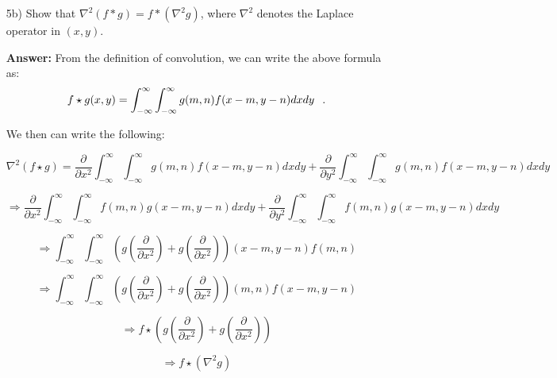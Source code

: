 \documentclass{article}
\begin{document}
\begin{enumerate}
\newpage
\item[5b)] Show that $\nabla ^2(f*g)=f*(\nabla ^2g)$, where $\nabla ^2$ denotes the Laplace operator in $(x,y)$. 

\textbf{Answer: }From the definition of convolution, we can write the above formula as:
$$f \star g(x,y) = \int_{-\infty}^{\infty} \int_{-\infty}^{\infty} g(m,n) f(x - m, y - n) dxdy\hspace{0.1in} .$$

We then can write the following:

\small
\begin{equation}
\nabla ^2 (f \star g) = \frac{\partial}{\partial x^2} \int_{-\infty}^{\infty} \int_{-\infty}^{\infty} g(m,n) f(x - m, y - n) dxdy + \frac{\partial}{\partial y^2} \int_{-\infty}^{\infty} \int_{-\infty}^{\infty} g(m,n) f(x - m, y - n) dxdy
\end{equation}

\begin{equation}
\Rightarrow \frac{\partial}{\partial x^2} \int_{-\infty}^{\infty} \int_{-\infty}^{\infty} f(m,n) g(x - m, y - n) dxdy + \frac{\partial}{\partial y^2} \int_{-\infty}^{\infty} \int_{-\infty}^{\infty}  f(m,n) g(x - m, y - n) dxdy
\end{equation}

\begin{equation}
\Rightarrow \int_{-\infty}^{\infty} \int_{-\infty}^{\infty} \left( g \left( \frac{\partial}{\partial x^2} \right) + g \left( \frac{\partial}{\partial x^2} \right) \right) (x-m, y - n) f(m,n)
\end{equation}

\begin{equation}
\Rightarrow \int_{-\infty}^{\infty} \int_{-\infty}^{\infty} \left( g \left( \frac{\partial}{\partial x^2} \right) + g \left( \frac{\partial}{\partial x^2} \right) \right) (m,n) f(x -m , y -n)
\end{equation}

\begin{equation}
\Rightarrow f \star \left( g \left( \frac{\partial}{\partial x^2} \right) + g \left( \frac{\partial}{\partial x^2} \right) \right)
\end{equation}

\begin{equation}
\Rightarrow f \star (\nabla ^2g)
\end{equation}
\normalsize
\end{enumerate}
\end{document}
